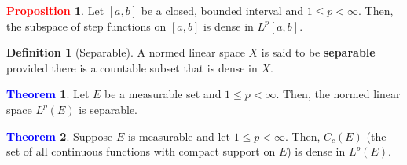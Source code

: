 \documentclass[11pt]{article}
\theoremstyle{definition}
\theoremstyle{definition}
\newtheorem{theorem}{\textcolor{blue}{Theorem}}
\theoremstyle{definition}
\newtheorem{definition}{\textcolor{OliveGreen}{Definition}}
\newtheorem{prop}{\textcolor{red}{Proposition}}
\theoremstyle{remark}
\begin{document}
\begin{prop}
	Let $[a,b]$ be a closed, bounded interval and $1 \leq p < \infty$. Then, the subspace of step functions on $[a,b]$ is dense in $L^p[a,b]$. 
\end{prop}

\begin{definition}[Separable] A normed linear space $X$ is said to be \textbf{separable} provided there is a countable subset that is dense in $X$. 
\end{definition}

\begin{theorem}
	Let $E$ be a measurable set and $1 \leq p < \infty$. Then, the normed linear space $L^p(E)$ is separable. 
\end{theorem}

\begin{theorem}
	Suppose $E$ is measurable and let $1 \leq p < \infty$. Then, $C_c(E)$ (the set of all continuous functions with compact support on $E$) is dense in $L^p(E)$. 
\end{theorem}
\end{document}
